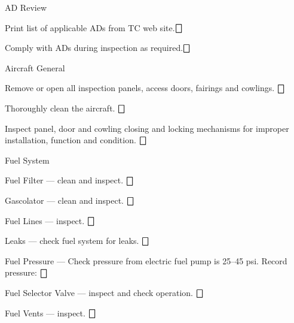 \begin{enumerate*}
	\item{AD Review}
	\begin{enumerate*}
		\item Print list of applicable ADs from TC web site.\dotfill $\bigbox$
		\item Comply with ADs during inspection as required.\dotfill $\bigbox$
	\end{enumerate*}

  \item{Aircraft General}
  \begin{enumerate*}
    \item Remove or open all inspection panels, access doors, fairings and cowlings. \dotfill $\bigbox$
    \item Thoroughly clean the aircraft. \dotfill $\bigbox$
    \item Inspect panel, door and cowling closing and locking mechanisms for improper installation, function and condition. \dotfill $\bigbox$
		\end{enumerate*}

	\item{Fuel System} 
	\begin{enumerate*}
		\item Fuel Filter --- clean and inspect.  \dotfill $\bigbox$
		\item Gascolator --- clean and inspect.  \dotfill $\bigbox$
		\item Fuel Lines --- inspect. \dotfill $\bigbox$
		\item Leaks --- check fuel system for leaks. \dotfill $\bigbox$
		\item Fuel Pressure --- Check pressure from electric fuel pump is 25--45 psi. Record pressure: \underline{\makebox[0.5in][l]{}} \dotfill $\bigbox$
		\item Fuel Selector Valve --- inspect and check operation. \dotfill $\bigbox$
		\item Fuel Vents --- inspect. \dotfill $\bigbox$
	\end{enumerate*}



\end{enumerate*}

